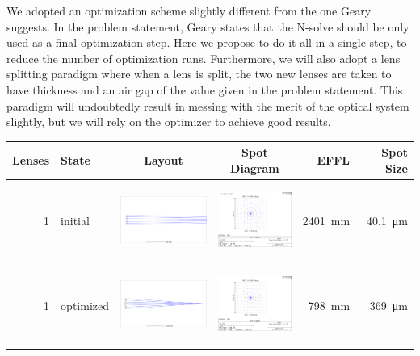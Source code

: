 \documentclass[10pt]{article}
\begin{document}
We adopted an optimization scheme slightly different from the one Geary suggests. In the problem statement, Geary states that the N-solve should be only used as a final optimization step. Here we propose to do it all in a single step, to reduce the number of optimization runs. Furthermore, we will also adopt a lens splitting paradigm where when a lens is split, the two new lenses are taken to have thickness and an air gap of the value given in the problem statement. This paradigm will undoubtedly result in messing with the merit of the optical system slightly, but we will rely on the optimizer to achieve good results. 
\begin{table}[h!]
	\centering
	\begin{tabular}{|r|l|c|c|r|r|}
		\hline
		Lenses & State & Layout & Spot Diagram & EFFL & Spot Size \\ \hline
		1 & initial & \includegraphics[trim={0.8cm 10cm 40cm 10cm}, clip,height=2.5cm]{../zemax/1_oneElement/1_initial/layout.png} &	
		\includegraphics[trim={7.1cm 8.5cm 12cm 2.6cm}, clip,height=2.5cm]{../zemax/1_oneElement/1_initial/spot.png} &  \SI{2401}{\milli \meter} &  \SI{40.1}{\micro \meter} \\\hline
		1 & optimized & \includegraphics[trim={0.1cm 10cm 40cm 10cm}, clip,height=2.5cm]{../zemax/1_oneElement/2_optimize_RMS/layout.png} & 
		\includegraphics[trim={7.1cm 8.5cm 12cm 2.6cm}, clip,height=2.5cm]{../zemax/1_oneElement/2_optimize_RMS/spot.png} &  \SI{798}{\milli \meter} &  \SI{369}{\micro \meter}\\\hline

\end{tabular}
\end{table}
\end{document}
